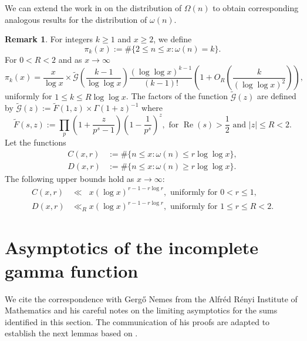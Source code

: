 \documentclass[11pt,reqno,a4letter]{article}
\numberwithin{equation}{section}
\numberwithin{figure}{section}
\numberwithin{table}{section}
\theoremstyle{plain}
\numberwithin{theorem}{section}
\theoremstyle{definition}
\newtheorem{remark}[theorem]{Remark}
\renewcommand{\Re}{\operatorname{Re}}
\begin{document}
We can extend the work in \cite{MV} on the distribution of $\Omega(n)$ to obtain 
corresponding analogous results for the distribution of $\omega(n)$. 

\begin{remark} 
\label{remark_MV_Pikx_FuncResultsAnnotated_v1} 
For integers $k  \geq 1$ and $x \geq 2$, we define 
\[
\pi_k(x) := \#\{2 \leq n \leq x: \omega(n)=k\}.
\]
For $0 < R < 2$ and as $x \rightarrow \infty$ 
\begin{equation}
\label{eqn_Pikx_UniformAsymptoticsStmt_from_MV_v2} 
\pi_k(x) = \frac{x}{\log x} \times 
     \widetilde{\mathcal{G}}\left(\frac{k-1}{\log\log x}\right) 
     \frac{(\log\log x)^{k-1}}{(k-1)!} \left( 
     1 + O_R\left(\frac{k}{(\log\log x)^2}\right) 
     \right), 
\end{equation}
uniformly for $1 \leq k \leq R\log\log x$. 
The factors of the function $\widetilde{\mathcal{G}}(z)$ are 
defined by $\widetilde{\mathcal{G}}(z) := \widetilde{F}(1, z) \times \Gamma(1+z)^{-1}$ where 
\[
\widetilde{F}(s, z) := \prod_p \left(1 + \frac{z}{p^s-1}\right) \left(1 - \frac{1}{p^s}\right)^{z}, 
	\text{ for } \Re(s) > \frac{1}{2} \text{ and } |z| \leq R < 2. 
\]
Let the functions 
\begin{align*} 
C(x, r) & := \#\{n \leq x: \omega(n) \leq r \log\log x\}, \\ 
D(x, r) & := \#\{n \leq x: \omega(n) \geq r \log\log x\}. 
\end{align*} 
The following upper bounds hold as $x \rightarrow \infty$: 
\begin{align*} 
C(x, r) & \ll\phantom{_R} x (\log x)^{r - 1 - r \log r}, \text{ uniformly for } 0 < r \leq 1, \\ 
D(x, r) & \ll_R x (\log x)^{r - 1 - r \log r}, \text{ uniformly for } 1 \leq r \leq R < 2.
\end{align*} 
\end{remark} 

\section{Asymptotics of the incomplete gamma function} 
\label{subSection_OtherFactsAndResults} 

We cite the correspondence with Gerg\H{o} Nemes 
from the Alfr\'{e}d R\'{e}nyi Institute of Mathematics and his 
careful notes on the limiting asymptotics for the sums identified in this section. 
The communication of his proofs are adapted to establish the next lemmas based on 
\cite{NEMES2015C,NEMES2016,NEMES2019}. 
\end{document}

